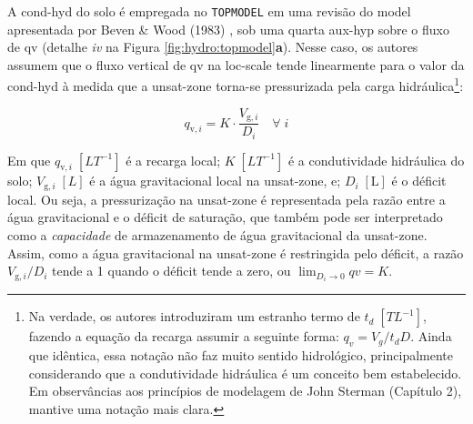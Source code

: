 \documentclass[./main.tex]{subfiles}
\begin{document}
\par A \gls{cond-hyd} do solo é empregada no \texttt{TOPMODEL} em uma revisão do \gls{model} apresentada por Beven \& Wood (1983) \cite{Beven1983a}, sob uma quarta \gls{aux-hyp} sobre o fluxo de \gls{qv} (detalhe \textit{iv} na Figura \ref{fig:hydro:topmodel}\textbf{a}). Nesse caso, os autores assumem que o fluxo vertical de \gls{qv} na \gls{loc-scale} tende linearmente para o valor da \gls{cond-hyd} à medida que a \gls{unsat-zone} torna-se pressurizada pela carga hidráulica\footnote{Na verdade, os autores introduziram um estranho termo de  $t_d\; [TL^{-1}]$, fazendo a equação da recarga assumir a seguinte forma: $q_v = V_g / t_d D$. Ainda que idêntica, essa notação não faz muito sentido hidrológico, principalmente considerando que a condutividade hidráulica é um conceito bem estabelecido. Em observâncias aos princípios de modelagem de John Sterman (Capítulo 2), mantive uma notação mais clara.}:
\begin{linenomath*}
\begin{equation}
\label{eq:topmodel:qv}
q_{\text{v}, i} = K \cdot \frac{V_{\text{g}, i}}{D_i}  \quad \forall \; i
\end{equation}
\end{linenomath*}
Em que $q_{\text{v}, i}\;[LT^{-1}]$ é a recarga local; $K\;[LT^{-1}]$ é a condutividade hidráulica do solo; $V_{\text{g}, i}\;[L]$ é a água gravitacional local na \gls{unsat-zone}, e; $D_{i} \; [\text{L}]$ é o déficit local. Ou seja, a pressurização na \gls{unsat-zone} é representada pela razão entre a água gravitacional e o déficit de saturação, que também pode ser interpretado como a \textit{capacidade} de armazenamento de água gravitacional da \gls{unsat-zone}. Assim, como a água gravitacional na \gls{unsat-zone} é restringida pelo déficit, a razão $V_{\text{g}, i}/D_i$ tende a 1 quando o déficit tende a zero, ou $\lim _{D_i \to 0} qv= K$. 
\end{document}
